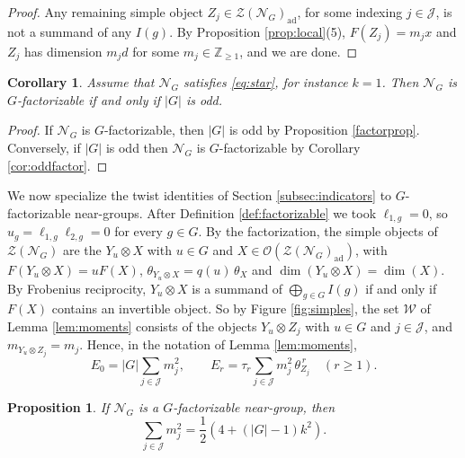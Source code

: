 \documentclass[10pt]{article}
\theoremstyle{plain}
\newtheorem{proposition}[theorem]{Proposition}
\newtheorem{corollary}[theorem]{Corollary}
\theoremstyle{definition}
\theoremstyle{plain}
\begin{document}
\begin{proof}
\par Any remaining simple object $Z_j\in\mathcal{Z}(\mathcal{N}_G)_\mathrm{ad}$, for some indexing $j\in\mathcal{J}$, is not a summand of any $I(g)$. By Proposition \ref{prop:local}(5), $F(Z_j)=m_jx$ and $Z_j$ has dimension $m_jd$ for some $m_j\in\mathbb{Z}_{\geq1}$, and we are done.
\end{proof}

\begin{corollary}\label{cor:factiff}
    Assume that $\mathcal{N}_G$ satisfies \eqref{eq:star}, for instance $k=1$.  Then $\mathcal{N}_G$ is $G$-factorizable if and only if $|G|$ is odd.
\end{corollary}

\begin{proof}
    If $\mathcal{N}_G$ is $G$-factorizable, then $|G|$ is odd by Proposition \ref{factorprop}.  Conversely, if $|G|$ is odd then $\mathcal{N}_G$ is $G$-factorizable by Corollary \ref{cor:oddfactor}.
\end{proof}
    
\par We now specialize the twist identities of Section \ref{subsec:indicators} to $G$-factorizable near-groups. After Definition \ref{def:factorizable} we took $\ell_{1,g}=0$, so $u_g=\ell_{1,g}\ell_{2,g}=0$ for every $g\in G$. By the factorization, the simple objects of $\mathcal{Z}(\mathcal{N}_G)$ are the $Y_u\otimes X$ with $u\in G$ and $X\in\mathcal{O}(\mathcal{Z}(\mathcal{N}_G)_\mathrm{ad})$, with $F(Y_u\otimes X)=uF(X)$, $\theta_{Y_u\otimes X}=q(u)\,\theta_X$ and $\dim(Y_u\otimes X)=\dim(X)$. By Frobenius reciprocity, $Y_u\otimes X$ is a summand of $\bigoplus_{g\in G}I(g)$ if and only if $F(X)$ contains an invertible object. So by Figure \ref{fig:simples}, the set $\mathcal{W}$ of Lemma \ref{lem:moments} consists of the objects $Y_u\otimes Z_j$ with $u\in G$ and $j\in\mathcal{J}$, and $m_{Y_u\otimes Z_j}=m_j$. Hence, in the notation of Lemma \ref{lem:moments},
\begin{equation}\label{eq:Wfact}
  E_0=|G|\sum_{j\in\mathcal{J}}m_j^2,\qquad E_r=\tau_r\sum_{j\in\mathcal{J}}m_j^2\,\theta_{Z_j}^{\,r}\quad(r\geq1).
\end{equation}

\begin{proposition}\label{prop:sumbj}
    If $\mathcal{N}_G$ is a $G$-factorizable near-group, then
\begin{equation}
    \sum_{j\in\mathcal{J}}m_j^2=\frac{1}{2}(4+(|G|-1)k^2).
\end{equation}
\end{proposition}
\end{document}
